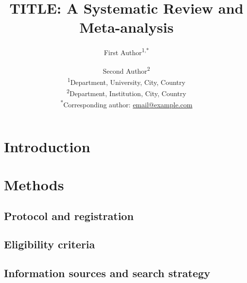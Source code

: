 \documentclass[12pt,a4paper]{article}
\title{TITLE: A Systematic Review and Meta-analysis}
\author{
    First Author\textsuperscript{1,*} \and
    Second Author\textsuperscript{2}
    \\[1em]
    \small\textsuperscript{1}Department, University, City, Country \\
    \small\textsuperscript{2}Department, Institution, City, Country \\
    \small\textsuperscript{*}Corresponding author: \href{mailto:email@example.com}{email@example.com}
}
\date{}
\begin{document}
\maketitle

\begin{abstract}
\end{abstract}

\tableofcontents
\newpage

\section{Introduction}

\section{Methods}

\subsection{Protocol and registration}

\subsection{Eligibility criteria}

\subsection{Information sources and search strategy}
\end{document}
